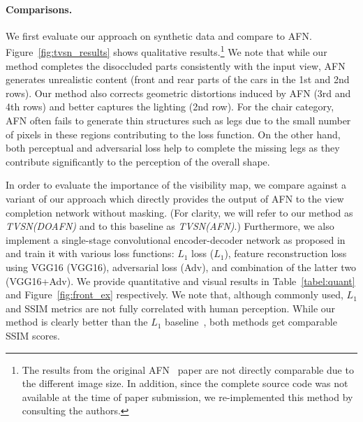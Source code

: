 \documentclass[10pt,twocolumn,letterpaper]{article}
\begin{document}
\vspace{-2mm}
\paragraph{Comparisons.} We first evaluate our approach on synthetic data and compare to AFN. Figure~\ref{fig:tvsn_results} shows qualitative results.\footnote{The results from the original AFN~\cite{Zhou_eccv2016} paper are not directly comparable due to the different image size. In addition, since the complete source code was not available at the time of paper submission, we re-implemented this method by consulting the authors.}
We note that while our method completes the disoccluded parts consistently with the input view, AFN generates unrealistic content (front and rear parts of the cars in the 1st and 2nd rows). Our method also corrects geometric distortions induced by AFN (3rd and 4th rows) and better captures the lighting (2nd row). For the chair category, AFN often fails to generate thin structures such as legs due to the small number of pixels in these regions contributing to the loss function. On the other hand, both perceptual and adversarial loss help to complete the missing legs as they contribute significantly to the perception of the overall shape.
%

\vspace{2mm}
In order to evaluate the importance of the visibility map, we compare against a variant of our approach which directly provides the output of AFN to the view completion network without masking. (For clarity, we will refer to our method as \emph{TVSN(DOAFN)} and to this baseline as \emph{TVSN(AFN)}.) Furthermore, we also implement a single-stage convolutional encoder-decoder network as proposed in~\cite{tatarchenko_eccv2016} and train it with various loss functions: $L_1$ loss ($L_1$), feature reconstruction loss using VGG16 (VGG16), adversarial loss (Adv), and combination of the latter two (VGG16+Adv).
We provide quantitative and visual results in Table~\ref{tabel:quant} and Figure~\ref{fig:front_ex} respectively. We note that, although commonly used, $L_1$ and SSIM metrics are not fully correlated with human perception. While our method is clearly better than the $L_1$ baseline~\cite{tatarchenko_eccv2016}, both methods get comparable SSIM scores. 
\end{document}

